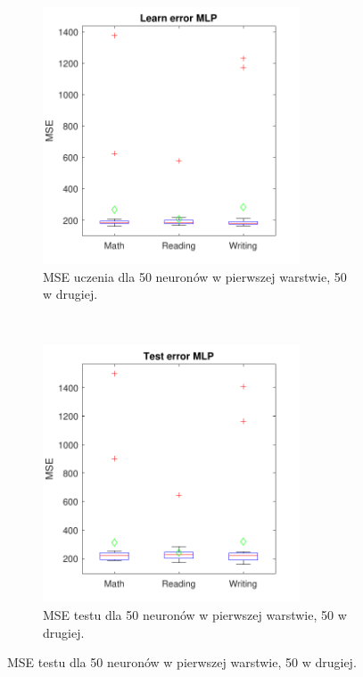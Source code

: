 \documentclass[12pt]{article}
\begin{document}
\begin{figure}[H]
\centering
\begin{subfigure}[t]{0.48\textwidth} 
\centering
\includegraphics[height=3in]{logsig_tansig_tansig_20_learnBoxplot.pdf}
\caption{MSE uczenia dla  50 neuronów w pierwszej warstwie, 50 w drugiej.}
\end{subfigure}
~~
\begin{subfigure}[t]{0.48\textwidth} 
\centering
\includegraphics[height=3in]{logsig_tansig_tansig_20_testBoxplot.pdf}
\caption{MSE testu dla  50 neuronów w pierwszej warstwie, 50 w drugiej.}
\end{subfigure}


\end{figure}
\end{document}

